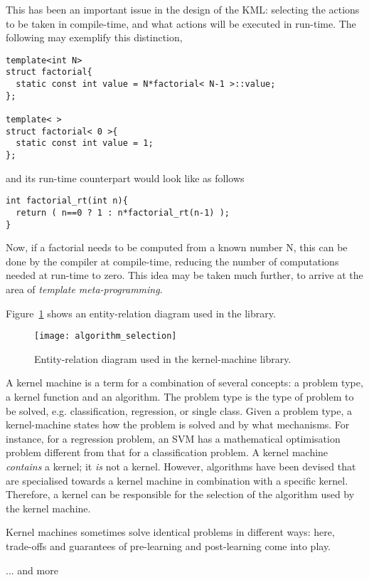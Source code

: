 \documentclass{article}
\begin{document}
This has been an important issue in the design of the KML: selecting 
the actions to be taken in compile-time, and what actions will be executed in
run-time. The following may exemplify this distinction,

\highlightcpp{}
\begin{verbatim}
template<int N>
struct factorial{
  static const int value = N*factorial< N-1 >::value;
};

template< >
struct factorial< 0 >{
  static const int value = 1;
};
\end{verbatim}
and its run-time counterpart would look like as follows

\highlightcpp{}
\begin{verbatim}
int factorial_rt(int n){
  return ( n==0 ? 1 : n*factorial_rt(n-1) );
}
\end{verbatim}
%
Now, if a factorial needs to be computed from a known number N, this
can be done by the compiler at compile-time, reducing the number of
computations needed at run-time to zero. 
%
This idea may be taken much further, to arrive at the area of 
\emph{template meta-programming}.


Figure~\ref{figure:design_kml} shows an entity-relation diagram
used in the library. %
\begin{figure}
\texttt{[image: algorithm\_selection]}%
\caption{Entity-relation diagram used in the kernel-machine library.}
\label{figure:design_kml}
\end{figure}
A kernel machine is a term for a combination of several concepts:
a problem type, a kernel function and an algorithm. The problem type is the
type of problem to be solved, e.g. classification, regression, or
single class. Given a problem type, a kernel-machine states how the
problem is solved and by what mechanisms. For instance, for a regression
problem, an SVM has a mathematical optimisation problem different
from that for a classification problem. A kernel machine \emph{contains}
a kernel; it \emph{is} not a kernel. However, algorithms have been
devised that are specialised towards a kernel machine in combination
with a specific kernel. Therefore, a kernel can be responsible for
the selection of the algorithm used by the kernel machine.

Kernel machines sometimes solve identical problems in different ways:
here, trade-offs and guarantees of pre-learning and post-learning
come into play.


... and more




\end{document}
